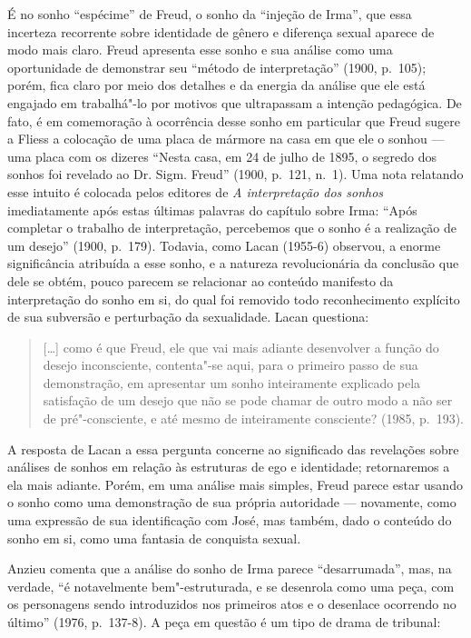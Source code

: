 É no sonho ``espécime'' de Freud, o sonho da ``injeção de Irma'', que
essa incerteza recorrente sobre identidade de gênero e diferença sexual
aparece de modo mais claro. Freud apresenta esse sonho e sua análise
como uma oportunidade de demonstrar seu ``método de interpretação''
(1900, p.~105); porém, fica claro por meio dos detalhes e da
energia da análise que ele está engajado em trabalhá"-lo por motivos que
ultrapassam a intenção pedagógica. De fato, é em comemoração à
ocorrência desse sonho em particular que Freud sugere a Fliess a
colocação de uma placa de mármore na casa em que ele o sonhou --- uma
placa com os dizeres ``Nesta casa, em 24 de julho de 1895, o segredo dos
sonhos foi revelado ao Dr. Sigm. Freud'' (1900, p.~121, n.~1). Uma nota
relatando esse intuito é colocada pelos editores de \emph{A
interpretação dos sonhos} imediatamente após estas últimas palavras do
capítulo sobre Irma: ``Após completar o trabalho de interpretação,
percebemos que o sonho é a realização de um desejo'' (1900, p.~179). Todavia,
como Lacan (1955-6) observou, a enorme significância atribuída a esse
sonho, e a natureza revolucionária da conclusão que dele se obtém, pouco
parecem se relacionar ao conteúdo manifesto da interpretação do sonho em
si, do qual foi removido todo reconhecimento explícito de sua subversão
e perturbação da sexualidade. Lacan questiona:

\begin{quote}
{[}\ldots{}{]} como é que Freud, ele que vai mais adiante desenvolver a
função do desejo inconsciente, contenta"-se aqui, para o primeiro passo
de sua demonstração, em apresentar um sonho inteiramente explicado pela
satisfação de um desejo que não se pode chamar de outro modo a não ser
de pré"-consciente, e até mesmo de inteiramente consciente? (1985, p.~193).
\end{quote}

A resposta de Lacan a essa pergunta concerne ao significado das
revelações sobre análises de sonhos em relação às estruturas de ego e
identidade; retornaremos a ela mais adiante. Porém, em uma análise mais
simples, Freud parece estar usando o sonho como uma demonstração de sua
própria autoridade --- novamente, como uma expressão de sua identificação
com José, mas também, dado o conteúdo do sonho em si, como uma fantasia
de conquista sexual.

Anzieu comenta que a análise do sonho de Irma parece ``desarrumada'',
mas, na verdade, ``é notavelmente bem"-estruturada, e se desenrola como
uma peça, com os personagens sendo introduzidos nos primeiros atos e o
desenlace ocorrendo no último'' (1976, p.~137-8). A peça em questão é
um tipo de drama de tribunal:

